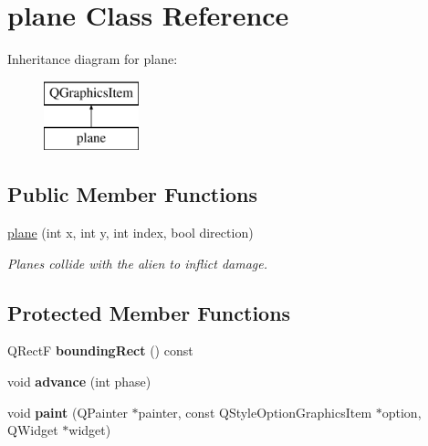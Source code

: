 \hypertarget{classplane}{\section{plane Class Reference}
\label{classplane}
}
Inheritance diagram for plane\-:\begin{figure}[H]
\begin{center}
\leavevmode
\includegraphics[height=2.000000cm]{classplane}
\end{center}
\end{figure}
\subsection*{Public Member Functions}
\begin{DoxyCompactItemize}
\item 
\hyperlink{classplane_a97cfc3d8bc2aad4732f48f736e4c7e96}{plane} (int x, int y, int index, bool direction)
\begin{DoxyCompactList}\small\item\em Planes collide with the alien to inflict damage. \end{DoxyCompactList}\end{DoxyCompactItemize}
\subsection*{Protected Member Functions}
\begin{DoxyCompactItemize}
\item 
\hypertarget{classplane_a9b1134aa73d32fe993837c31d7a94dd6}{Q\-Rect\-F {\bfseries bounding\-Rect} () const }\label{classplane_a9b1134aa73d32fe993837c31d7a94dd6}

\item 
\hypertarget{classplane_ae3fd03df5b6807372568214b94857e43}{void {\bfseries advance} (int phase)}\label{classplane_ae3fd03df5b6807372568214b94857e43}

\item 
\hypertarget{classplane_a1aaa0881b67ab65d4d088572cc6529c9}{void {\bfseries paint} (Q\-Painter $\ast$painter, const Q\-Style\-Option\-Graphics\-Item $\ast$option, Q\-Widget $\ast$widget)}\label{classplane_a1aaa0881b67ab65d4d088572cc6529c9}

\end{DoxyCompactItemize}
